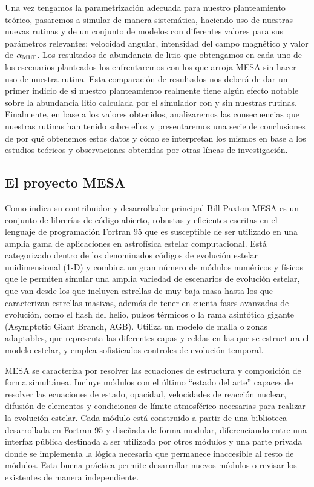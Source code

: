 Una vez tengamos la parametrización adecuada para nuestro planteamiento teórico, pasaremos a simular de manera sistemática, haciendo uso de nuestras nuevas rutinas y de un conjunto de modelos con diferentes valores para sus parámetros relevantes: velocidad angular, intensidad del campo magnético y valor de $\alpha_{\mathrm{MLT}}$. Los resultados de abundancia de litio que obtengamos en cada uno de los escenarios planteados los enfrentaremos con los que arroja MESA sin hacer uso de nuestra rutina. Esta comparación de resultados nos deberá de dar un primer indicio de si nuestro planteamiento realmente tiene algún efecto notable sobre la abundancia litio calculada por el simulador con y sin nuestras rutinas. Finalmente, en base a los valores obtenidos, analizaremos las consecuencias que nuestras rutinas han tenido sobre ellos y presentaremos una serie de conclusiones de por qué obtenemos estos datos y cómo se interpretan los mismos en base a los estudios teóricos y observaciones obtenidas por otras líneas de investigación.\par

\subsection{El proyecto MESA}
Como indica su contribuidor y desarrollador principal Bill Paxton \citep{Paxton2011, Paxton2013, Paxton2015, Paxton2018} MESA es un conjunto de librerías de código abierto, robustas y eficientes escritas en el lenguaje de programación Fortran 95 que es susceptible de ser utilizado en una amplia gama de aplicaciones en astrofísica estelar computacional. Está categorizado dentro de los denominados códigos de evolución estelar unidimensional (1-D) y combina un gran número de módulos numéricos y físicos que le permiten simular una amplia variedad de escenarios de evolución estelar, que van desde los que incluyen estrellas de muy baja masa hasta los que caracterizan estrellas masivas, además de tener en cuenta fases avanzadas de evolución, como el flash del helio, pulsos térmicos o la rama asintótica gigante (Asymptotic Giant Branch, AGB). Utiliza un modelo de malla o zonas adaptables, que representa las diferentes capas y celdas en las que se estructura el modelo estelar, y emplea sofisticados controles de evolución temporal.\par

MESA se caracteriza por resolver las ecuaciones de estructura y composición de forma simultánea. Incluye módulos con el último “estado del arte” capaces de resolver las ecuaciones de estado, opacidad, velocidades de reacción nuclear, difusión de elementos y condiciones de límite atmosférico necesarias para realizar la evolución estelar. Cada módulo está construido a partir de una biblioteca desarrollada en Fortran 95 y diseñada de forma modular, diferenciando entre una interfaz pública destinada a ser utilizada por otros módulos y una parte privada donde se implementa la lógica necesaria que permanece inaccesible al resto de módulos. Esta buena práctica permite desarrollar nuevos módulos o revisar los existentes de manera independiente.\par

